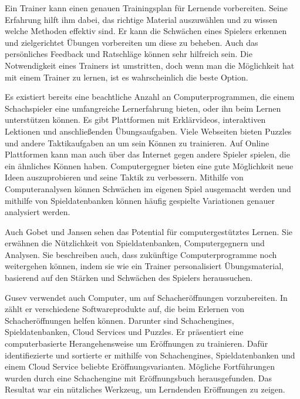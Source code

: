 Ein Trainer kann einen genauen Trainingsplan für Lernende vorbereiten.
Seine Erfahrung hilft ihm dabei, das richtige Material auszuwählen und zu wissen welche Methoden effektiv sind.
Er kann die Schwächen eines Spielers erkennen und zielgerichtet Übungen vorbereiten um diese zu beheben. Auch das persönliches Feedback und Ratschläge können sehr hilfreich sein. Die Notwendigkeit eines Trainers ist umstritten, doch wenn man die Möglichkeit hat mit einem Trainer zu lernen, ist es wahrscheinlich die beste Option.
\cite{gobet_training_2006}

Es existiert bereits eine beachtliche Anzahl an Computerprogrammen, die einem Schachspieler eine umfangreiche Lernerfahrung bieten, oder ihn beim Lernen unterstützen können. Es gibt Plattformen mit Erklärvideos, interaktiven Lektionen und anschließenden Übungsaufgaben. Viele Webseiten bieten Puzzles und andere Taktikaufgaben an um sein Können zu trainieren. Auf Online Plattformen kann man auch über das Internet gegen andere Spieler spielen, die ein ähnliches Können haben. Computergegner bieten eine gute Möglichkeit neue Ideen auszuprobieren und seine Taktik zu verbessern. Mithilfe von Computeranalysen können Schwächen im eigenen Spiel ausgemacht werden und mithilfe von Spieldatenbanken können häufig gespielte Variationen genauer analysiert werden.

Auch Gobet und Jansen sehen das Potential für computergestütztes Lernen. Sie erwähnen die Nützlichkeit von Spieldatenbanken, Computergegnern und Analysen. Sie beschreiben auch, dass zukünftige Computerprogramme noch weitergehen können, indem sie wie ein Trainer personalisiert Übungsmaterial, basierend auf den Stärken und Schwächen des Spielers heraussuchen.
\cite{gobet_training_2006} 

Gusev verwendet auch Computer, um auf Schacheröffnungen vorzubereiten. In \cite{gusev_using_2021} zählt er verschiedene Softwareprodukte auf, die beim Erlernen von Schacheröffnungen helfen können. Darunter sind Schachengines, Spieldatenbanken, Cloud Services und Puzzles. Er präsentiert eine computerbasierte Herangehensweise um Eröffnungen zu trainieren. Dafür identifiezierte und sortierte er mithilfe von Schachengines, Spieldatenbanken und einem Cloud Service beliebte Eröffnungsvarianten. Mögliche Fortführungen wurden durch eine Schachengine mit Eröffnungsbuch herausgefunden. Das Resultat war ein nützliches Werkzeug, um Lerndenden Eröffnungen zu zeigen.

